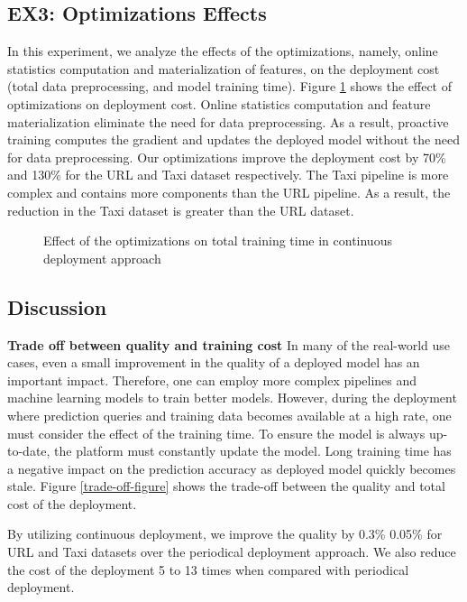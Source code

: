 \subsection{EX3: Optimizations Effects}
In this experiment, we analyze the effects of the optimizations, namely, online statistics computation and materialization of features, on the deployment cost (total data preprocessing, and model training time).
Figure \ref{optimization-effect} shows the effect of optimizations on deployment cost.
Online statistics computation and feature materialization eliminate the need for data preprocessing.
As a result, proactive training computes the gradient and updates the deployed model without the need for data preprocessing.
Our optimizations improve the deployment cost by 70\% and 130\% for the URL and Taxi dataset respectively.
The Taxi pipeline is more complex and contains more components than the URL pipeline.
As a result, the reduction in the Taxi dataset is greater than the URL dataset.

\begin{figure}[h!]
\centering
\resizebox{\columnwidth}{!}{}
\caption{Effect of the optimizations on total training time in continuous deployment approach}
\label{optimization-effect}
\end{figure}

\subsection{Discussion} \label{subsec:discussion}
\textbf{Trade off between quality and training cost}
In many of the real-world use cases, even a small improvement in the quality of a deployed model has an important impact.
Therefore, one can employ more complex pipelines and machine learning models to train better models.
However, during the deployment where prediction queries and training data becomes available at a high rate, one must consider the effect of the training time.
To ensure the model is always up-to-date, the platform must constantly update the model.
Long training time has a negative impact on the prediction accuracy as deployed model quickly becomes stale.
Figure \ref{trade-off-figure} shows the trade-off between the quality and total cost of the deployment.

By utilizing continuous deployment, we improve the quality by 0.3\% 0.05\% for URL and Taxi datasets over the periodical deployment approach.
We also reduce the cost of the deployment 5 to 13 times when compared with periodical deployment.

